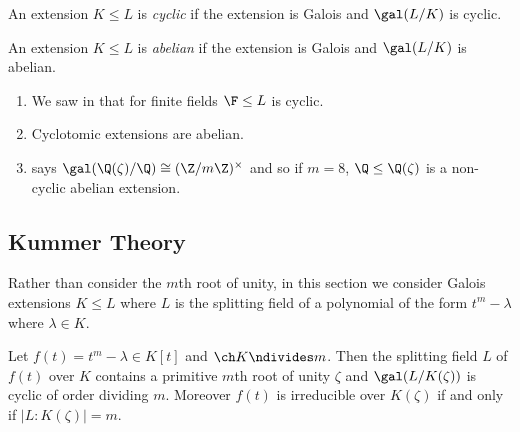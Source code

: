 \documentclass[a4paper]{article}
\begin{document}
\begin{definition}
  An extension \(K \leq L\) is \emph{cyclic} if the extension is Galois and \(\gal(L/K)\) is cyclic.
\end{definition}

\begin{definition}
  An extension \(K \leq L\) is \emph{abelian} if the extension is Galois and \(\gal(L/K)\) is abelian.
\end{definition}

\begin{eg}\leavevmode
  \begin{enumerate}
  \item We saw in  that for finite fields \(\F \leq L\) is cyclic.
  \item Cyclotomic extensions are abelian.
  \item {} says \(\gal(\Q(\zeta)/\Q) \cong  (\Z/m\Z)^\times\) and so if \(m = 8\), \(\Q \leq \Q(\zeta)\) is a non-cyclic abelian extension.
  \end{enumerate}
\end{eg}

\subsection{Kummer Theory}

Rather than consider the \(m\)th root of unity, in this section we consider Galois extensions \(K \leq L\) where \(L\) is the splitting field of a polynomial of the form \(t^m - \lambda\) where \(\lambda \in K\).

\begin{theorem}
  \label{thm:splitting field of tm - lambda}
  Let \(f(t) = t^m - \lambda \in K[t]\) and \(\ch K \ndivides m\). Then the splitting field \(L\) of \(f(t)\) over \(K\) contains a primitive \(m\)th root of unity \(\zeta\) and \(\gal(L/K(\zeta))\) is cyclic of order dividing \(m\). Moreover \(f(t)\) is irreducible over \(K(\zeta)\) if and only if \(|L:K(\zeta)| = m\).
\end{theorem}
\end{document}
